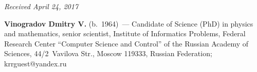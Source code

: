 \begin{multicols}{2}
{{\begin{thebibliography}{99}
\end{thebibliography}

 }
 }

\end{multicols}

\vspace*{-6pt}

\hfill{\small\textit{Received April 24, 2017}}


\Contrl

\noindent
\textbf{Vinogradov Dmitry V.} (b.\ 1964)~--- Candidate of Science (PhD) in physics and mathematics, 
senior scientist, Institute of Informatics Problems, Federal Research Center ``Computer Science and 
Control'' of the Russian Academy of Sciences, 44/2~Vavilova Str., Moscow 119333, Russian Federation; 
\mbox{krrguest@yandex.ru} 
\label{end\stat}


\renewcommand{\bibname}{\protect\rm Литература} 